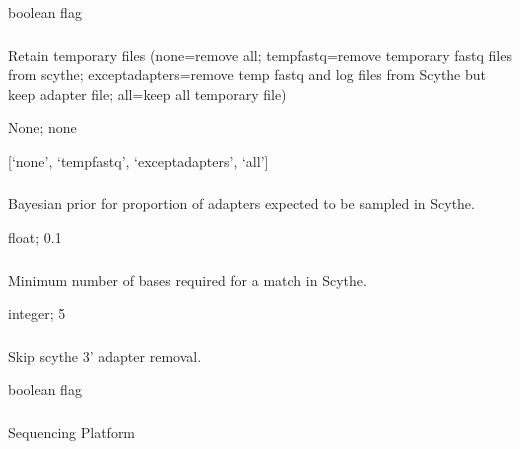 \documentclass[letterpaper,10pt,english]{sphinxmanual}
\begin{document}
 boolean flag


\subsubsection{}
\label{\detokenize{prog_desc:retain-temp}}
 Retain temporary files (none=remove all; tempfastq=remove temporary fastq files from scythe; exceptadapters=remove temp fastq and log files from Scythe but keep adapter file; all=keep all temporary file)

 None;  none

 {[}‘none’, ‘tempfastq’, ‘exceptadapters’, ‘all’{]}


\subsubsection{}
\label{\detokenize{prog_desc:s-scythe-prior}}
 Bayesian prior for proportion of adapters expected to be sampled in Scythe.

 float;  0.1


\subsubsection{}
\label{\detokenize{prog_desc:scythe-match}}
 Minimum number of bases required for a match in Scythe.

 integer;  5


\subsubsection{}
\label{\detokenize{prog_desc:scythe-skip}}
 Skip scythe 3’ adapter removal.

 boolean flag


\subsubsection{}
\label{\detokenize{prog_desc:t-platform}}
 Sequencing Platform
\end{document}

